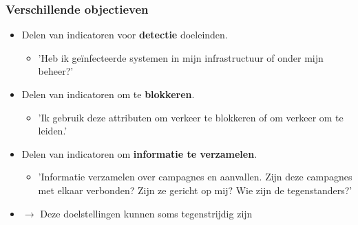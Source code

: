\begin{frame}
\frametitle{Verschillende objectieven}
        \begin{itemize}
                \item Delen van indicatoren voor {\bf detectie} doeleinden.
                        \begin{itemize}
                                \item 'Heb ik geïnfecteerde systemen in mijn infrastructuur of onder mijn beheer?'
                        \end{itemize}
                \item Delen van  indicatoren om te {\bf blokkeren}.
                        \begin{itemize}
                                \item 'Ik gebruik deze attributen om verkeer te blokkeren of om verkeer om te leiden.'
                        \end{itemize}
                \item Delen van  indicatoren om {\bf informatie te verzamelen}.
                        \begin{itemize}
                                \item 'Informatie verzamelen over campagnes en aanvallen. Zijn deze campagnes met elkaar verbonden? Zijn ze gericht op mij? Wie zijn de tegenstanders?'
                        \end{itemize}
                \item $\rightarrow$ Deze doelstellingen kunnen soms tegenstrijdig zijn
        \end{itemize}
\end{frame}

